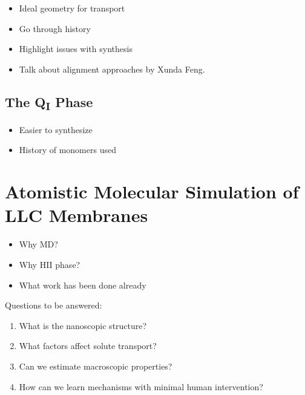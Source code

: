   \begin{itemize}
    \item Ideal geometry for transport
    \item Go through history
    \item Highlight issues with synthesis
    \item Talk about alignment approaches by Xunda Feng.
  \end{itemize}
  
  \subsection{The Q\textsubscript{I} Phase}
  
  \begin{itemize}
    \item Easier to synthesize
    \item History of monomers used
  \end{itemize}
  
  \section{Atomistic Molecular Simulation of LLC Membranes}
  
  \begin{itemize}
    \item Why MD?
    \item Why HII phase?
    \item What work has been done already
  \end{itemize}

  Questions to be answered: %
  \begin{enumerate}
    \item What is the nanoscopic structure?  %
    \item What factors affect solute transport?  %
    \item Can we estimate macroscopic properties?
    \item How can we learn mechanisms with minimal human intervention?  %
  \end{enumerate} 
